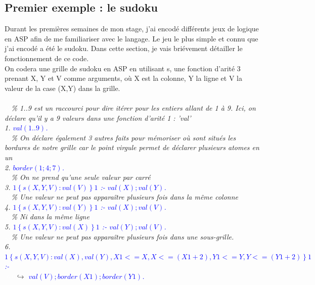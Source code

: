 \documentclass[12pt,a4paper]{article}
\begin{document}
\subsection{Premier exemple : le sudoku}
Durant les premières semaines de mon stage, j'ai encodé différents jeux de logique en ASP afin de me familiariser avec le langage. Le jeu le plus simple et connu que j'ai encodé a été le sudoku. Dans cette section, je vais 
briévement détailler le fonctionnement de ce code.\\
On codera une grille de sudoku en ASP en utilisant s, une fonction d'arité 3 prenant X, Y et V comme arguments, où X est la colonne, Y la ligne et V la valeur de la case (X,Y) dans la grille.\\ \\
\emph{
	\textcolor{white}{2c}\% 1..9 est un raccourci pour dire itérer pour les entiers allant de 1 à 9. Ici, on déclare qu'il y a 9 valeurs dans une fonction d'arité 1 : 'val'\\
	1. \textcolor{blue}{$val(1..9)$.}\\
	\textcolor{white}{2c}\% On déclare également 3 autres faits pour mémoriser où sont situés les bordures de notre grille car le point virgule permet de déclarer plusieurs atomes en un\\
	2. \textcolor{blue}{$border(1;4;7)$.}\\
	\textcolor{white}{2c}\% On ne prend qu'une seule valeur par carré\\
	3. \textcolor{blue}{$1\left\{ s(X,Y,V): val(V) \right\}1$ :- $val(X) ; val(Y)$.}\\
	\textcolor{white}{2c}\% Une valeur ne peut pas apparaître plusieurs fois dans la même colonne\\
	4. \textcolor{blue}{$1\left\{ s(X,Y,V): val(Y) \right\}1$ :- $val(X) ; val(V)$.}\\
	\textcolor{white}{2c}\% Ni dans la même ligne\\
	5. \textcolor{blue}{$1\left\{ s(X,Y,V): val(X) \right\}1$ :- $val(Y) ; val(V)$.}\\
	\textcolor{white}{2c}\% Une valeur ne peut pas apparaître plusieurs fois dans une sous-grille.\\
	6. \textcolor{blue}{$1\left\{ s(X,Y,V): val(X), val(Y), X1<=X, X<=(X1+2), Y1<=Y, Y<=(Y1+2)\right\}1$ :-}\\
	\textcolor{white}{3ch}\qquad\qquad\qquad\qquad\qquad$\hookrightarrow$ \textcolor{blue}{$val(V) ; border(X1) ; border(Y1)$.}\\
}
\end{document}
